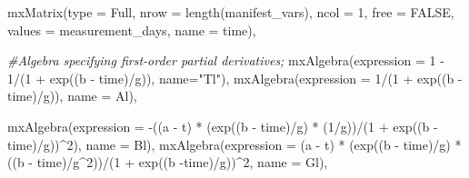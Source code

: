 \documentclass[
12pt, %
twoside,
english]{guelphthesis}
\newenvironment{Shaded}{\begin{snugshade}}{\end{snugshade}}
\newcommand{\AttributeTok}[1]{\textcolor[rgb]{0.77,0.63,0.00}{#1}}
\newcommand{\CommentTok}[1]{\textcolor[rgb]{0.56,0.35,0.01}{\textit{#1}}}
\newcommand{\ConstantTok}[1]{\textcolor[rgb]{0.00,0.00,0.00}{#1}}
\newcommand{\DecValTok}[1]{\textcolor[rgb]{0.00,0.00,0.81}{#1}}
\newcommand{\FunctionTok}[1]{\textcolor[rgb]{0.00,0.00,0.00}{#1}}
\newcommand{\NormalTok}[1]{#1}
\newcommand{\SpecialCharTok}[1]{\textcolor[rgb]{0.00,0.00,0.00}{#1}}
\newcommand{\StringTok}[1]{\textcolor[rgb]{0.31,0.60,0.02}{#1}}
\begin{document}
\begin{Shaded}
\begin{Highlighting}[numbers=left,,]
  \FunctionTok{mxMatrix}\NormalTok{(}\AttributeTok{type =} \StringTok{\textquotesingle{}Full\textquotesingle{}}\NormalTok{, }\AttributeTok{nrow =} \FunctionTok{length}\NormalTok{(manifest\_vars), }\AttributeTok{ncol =} \DecValTok{1}\NormalTok{, }\AttributeTok{free =} \ConstantTok{FALSE}\NormalTok{, }
           \AttributeTok{values =}\NormalTok{ measurement\_days, }\AttributeTok{name =} \StringTok{\textquotesingle{}time\textquotesingle{}}\NormalTok{),}
  
  \CommentTok{\#Algebra specifying first{-}order partial derivatives; }
  \FunctionTok{mxAlgebra}\NormalTok{(}\AttributeTok{expression =} \DecValTok{1} \SpecialCharTok{{-}} \DecValTok{1}\SpecialCharTok{/}\NormalTok{(}\DecValTok{1} \SpecialCharTok{+} \FunctionTok{exp}\NormalTok{((b }\SpecialCharTok{{-}}\NormalTok{ time)}\SpecialCharTok{/}\NormalTok{g)), }\AttributeTok{name=}\StringTok{"Tl"}\NormalTok{),}
  \FunctionTok{mxAlgebra}\NormalTok{(}\AttributeTok{expression =} \DecValTok{1}\SpecialCharTok{/}\NormalTok{(}\DecValTok{1} \SpecialCharTok{+} \FunctionTok{exp}\NormalTok{((b }\SpecialCharTok{{-}}\NormalTok{ time)}\SpecialCharTok{/}\NormalTok{g)), }\AttributeTok{name =} \StringTok{\textquotesingle{}Al\textquotesingle{}}\NormalTok{), }
  
  \FunctionTok{mxAlgebra}\NormalTok{(}\AttributeTok{expression =} \SpecialCharTok{{-}}\NormalTok{((a }\SpecialCharTok{{-}}\NormalTok{ t) }\SpecialCharTok{*}\NormalTok{ (}\FunctionTok{exp}\NormalTok{((b }\SpecialCharTok{{-}}\NormalTok{ time)}\SpecialCharTok{/}\NormalTok{g) }\SpecialCharTok{*}\NormalTok{ (}\DecValTok{1}\SpecialCharTok{/}\NormalTok{g))}\SpecialCharTok{/}\NormalTok{(}\DecValTok{1} \SpecialCharTok{+} \FunctionTok{exp}\NormalTok{((b }\SpecialCharTok{{-}}\NormalTok{ time)}\SpecialCharTok{/}\NormalTok{g))}\SpecialCharTok{\^{}}\DecValTok{2}\NormalTok{), }\AttributeTok{name =} \StringTok{\textquotesingle{}Bl\textquotesingle{}}\NormalTok{),}
  \FunctionTok{mxAlgebra}\NormalTok{(}\AttributeTok{expression =}\NormalTok{  (a }\SpecialCharTok{{-}}\NormalTok{ t) }\SpecialCharTok{*}\NormalTok{ (}\FunctionTok{exp}\NormalTok{((b }\SpecialCharTok{{-}}\NormalTok{ time)}\SpecialCharTok{/}\NormalTok{g) }\SpecialCharTok{*}\NormalTok{ ((b }\SpecialCharTok{{-}}\NormalTok{ time)}\SpecialCharTok{/}\NormalTok{g}\SpecialCharTok{\^{}}\DecValTok{2}\NormalTok{))}\SpecialCharTok{/}\NormalTok{(}\DecValTok{1} \SpecialCharTok{+} \FunctionTok{exp}\NormalTok{((b }\SpecialCharTok{{-}}\NormalTok{time)}\SpecialCharTok{/}\NormalTok{g))}\SpecialCharTok{\^{}}\DecValTok{2}\NormalTok{, }\AttributeTok{name =} \StringTok{\textquotesingle{}Gl\textquotesingle{}}\NormalTok{),}
  

\end{Highlighting}
\end{Shaded}
\end{document}
